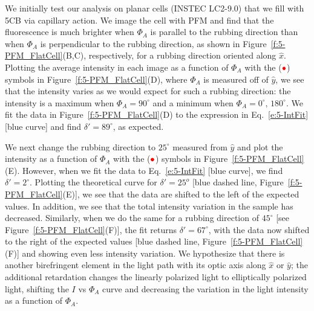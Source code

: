 We initially test our analysis on planar cells (INSTEC LC2-9.0) that we fill with 5CB via capillary action.
We image the cell with PFM and find that the fluorescence is much brighter when $\Phi_A$ is parallel to the rubbing direction than when $\Phi_A$ is perpendicular to the rubbing direction, as shown in Figure~\ref{f:5-PFM_FlatCell}(B,C), respectively, for a rubbing direction oriented along $\hat{x}$.
Plotting the average intensity in each image as a function of $\Phi_A$ with the (${\color{red} \bullet}$) symbols in Figure~\ref{f:5-PFM_FlatCell}(D), where $\Phi_A$ is measured off of $\hat{y}$, we see that the intensity varies as we would expect for such a rubbing direction: the intensity is a maximum when $\Phi_A = 90^{\circ}$ and a minimum when $\Phi_A = 0^{\circ}, \, 180^{\circ}$.
We fit the data in Figure~\ref{f:5-PFM_FlatCell}(D) to the expression in Eq.~\ref{e:5-IntFit} [blue curve] and find $\delta' = 89^{\circ}$, as expected.

We next change the rubbing direction to $25^{\circ}$ measured from $\hat{y}$ and plot the intensity as a function of $\Phi_A$ with the (${\color{red} \bullet}$) symbols in Figure~\ref{f:5-PFM_FlatCell}(E).
However, when we fit the data to Eq.~\ref{e:5-IntFit} [blue curve], we find $\delta' = 2^{\circ}$.
Plotting the theoretical curve for $\delta' =25^o$ [blue dashed line, Figure~\ref{f:5-PFM_FlatCell}(E)], we see that the data are shifted to the left of the expected values.
In addition, we see that the total intensity variation in the sample has decreased.
Similarly, when we do the same for a rubbing direction of $45^{\circ}$ [see Figure~\ref{f:5-PFM_FlatCell}(F)], the fit returns $\delta' = 67^{\circ}$, with the data now shifted to the right of the expected values [blue dashed line, Figure~\ref{f:5-PFM_FlatCell}(F)] and showing even less intensity variation.
We hypothesize that there is another birefringent element in the light path with its optic axis along $\hat{x}$ or $\hat{y}$; the additional retardation changes the linearly polarized light to elliptically polarized light, shifting the $I$ vs $\Phi_A$ curve and decreasing the variation in the light intensity as a function of $\Phi_A$.

